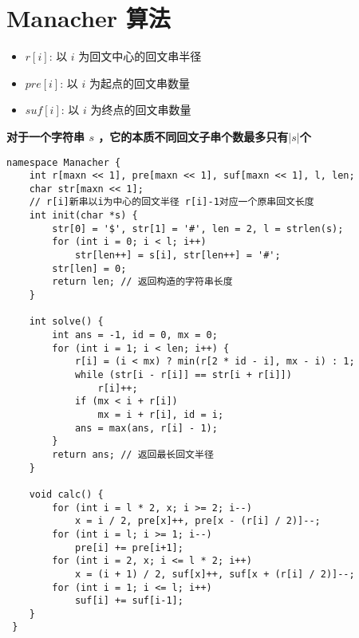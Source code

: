 \section{Manacher 算法}
\begin{itemize}
    \item $r[i]$: 以 $i$ 为回文中心的回文串半径
    \item $pre[i]$: 以 $i$ 为起点的回文串数量
    \item $suf[i]$: 以 $i$ 为终点的回文串数量
\end{itemize}
\textbf{对于一个字符串 $s$ ，它的本质不同回文子串个数最多只有$|s|$个}
\begin{verbatim}
namespace Manacher {
    int r[maxn << 1], pre[maxn << 1], suf[maxn << 1], l, len;
    char str[maxn << 1];
    // r[i]新串以i为中心的回文半径 r[i]-1对应一个原串回文长度
    int init(char *s) {
        str[0] = '$', str[1] = '#', len = 2, l = strlen(s);
        for (int i = 0; i < l; i++)
            str[len++] = s[i], str[len++] = '#';
        str[len] = 0;
        return len; // 返回构造的字符串长度
    }

    int solve() {
        int ans = -1, id = 0, mx = 0;
        for (int i = 1; i < len; i++) {
            r[i] = (i < mx) ? min(r[2 * id - i], mx - i) : 1;
            while (str[i - r[i]] == str[i + r[i]])
                r[i]++;
            if (mx < i + r[i])
                mx = i + r[i], id = i;
            ans = max(ans, r[i] - 1);
        }
        return ans; // 返回最长回文半径
    }

    void calc() {
        for (int i = l * 2, x; i >= 2; i--)
            x = i / 2, pre[x]++, pre[x - (r[i] / 2)]--;
        for (int i = l; i >= 1; i--)
            pre[i] += pre[i+1];
        for (int i = 2, x; i <= l * 2; i++)
            x = (i + 1) / 2, suf[x]++, suf[x + (r[i] / 2)]--;
        for (int i = 1; i <= l; i++)
            suf[i] += suf[i-1];
    }
 }
\end{verbatim}